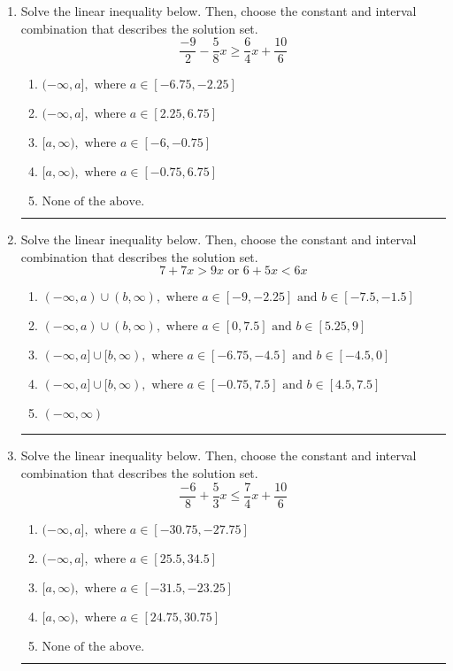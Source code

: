 \documentclass[14pt]{extbook}
\newcommand{\litem}[1]{\item#1\hspace*{-1cm}\rule{\textwidth}{0.4pt}}
\begin{document}
\begin{enumerate}
{\begin{enumerate}[label=\Alph*.]
\end{enumerate} }
\litem{
Solve the linear inequality below. Then, choose the constant and interval combination that describes the solution set.\[ \frac{-9}{2} - \frac{5}{8} x \geq \frac{6}{4} x + \frac{10}{6} \]\begin{enumerate}[label=\Alph*.]
\item \( (-\infty, a], \text{ where } a \in [-6.75, -2.25] \)
\item \( (-\infty, a], \text{ where } a \in [2.25, 6.75] \)
\item \( [a, \infty), \text{ where } a \in [-6, -0.75] \)
\item \( [a, \infty), \text{ where } a \in [-0.75, 6.75] \)
\item \( \text{None of the above}. \)

\end{enumerate} }
\litem{
Solve the linear inequality below. Then, choose the constant and interval combination that describes the solution set.\[ 7 + 7 x > 9 x \text{ or } 6 + 5 x < 6 x \]\begin{enumerate}[label=\Alph*.]
\item \( (-\infty, a) \cup (b, \infty), \text{ where } a \in [-9, -2.25] \text{ and } b \in [-7.5, -1.5] \)
\item \( (-\infty, a) \cup (b, \infty), \text{ where } a \in [0, 7.5] \text{ and } b \in [5.25, 9] \)
\item \( (-\infty, a] \cup [b, \infty), \text{ where } a \in [-6.75, -4.5] \text{ and } b \in [-4.5, 0] \)
\item \( (-\infty, a] \cup [b, \infty), \text{ where } a \in [-0.75, 7.5] \text{ and } b \in [4.5, 7.5] \)
\item \( (-\infty, \infty) \)

\end{enumerate} }
\litem{
Solve the linear inequality below. Then, choose the constant and interval combination that describes the solution set.\[ \frac{-6}{8} + \frac{5}{3} x \leq \frac{7}{4} x + \frac{10}{6} \]\begin{enumerate}[label=\Alph*.]
\item \( (-\infty, a], \text{ where } a \in [-30.75, -27.75] \)
\item \( (-\infty, a], \text{ where } a \in [25.5, 34.5] \)
\item \( [a, \infty), \text{ where } a \in [-31.5, -23.25] \)
\item \( [a, \infty), \text{ where } a \in [24.75, 30.75] \)
\item \( \text{None of the above}. \)


\end{enumerate}}
\end{enumerate}
\end{document}
